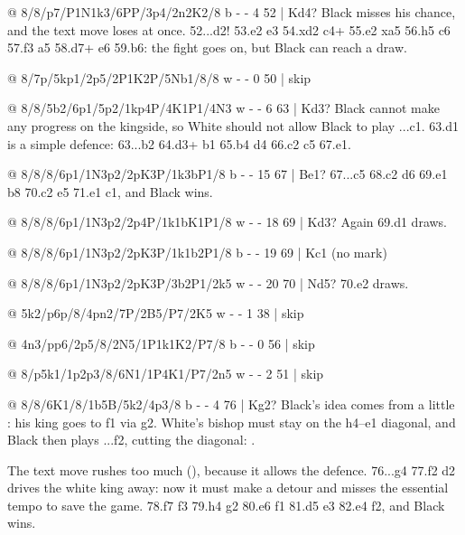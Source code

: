 @ 8/8/p7/P1N1k3/6PP/3p4/2n2K2/8 b - - 4 52 | Kd4?
Black misses his chance, and the text move loses at once. 52...d2! 53.\K e2 \N e3 54.\K xd2 \N c4+
55.\K e2 \N xa5 56.h5 \N c6 57.\K f3 a5 58.\N d7+ \K e6 59.\N b6: the fight goes on, but Black can
reach a draw.

@ 8/7p/5kp1/2p5/2P1K2P/5Nb1/8/8 w - - 0 50 | skip

@ 8/8/5b2/6p1/5p2/1kp4P/4K1P1/4N3 w - - 6 63 | Kd3?
Black cannot make any progress on the kingside, so White should not allow Black to play ...\K c1.
63.\K d1 is a simple defence: 63...\K b2 64.\N d3+ \K b1 65.\N b4 \B d4 66.\N c2 \B c5 67.\N e1.

@ 8/8/8/6p1/1N3p2/2pK3P/1k3bP1/8 b - - 15 67 | Be1?
67...\B c5 68.\N c2 \B d6 69.\N e1 \B b8 70.\N c2 \B e5 71.\N e1 \K c1, and Black wins.

@ 8/8/8/6p1/1N3p2/2p4P/1k1bK1P1/8 w - - 18 69 | Kd3?
Again 69.\K d1 draws.

@ 8/8/8/6p1/1N3p2/2pK3P/1k1b2P1/8 b - - 19 69 | Kc1 (no mark)

@ 8/8/8/6p1/1N3p2/2pK3P/3b2P1/2k5 w - - 20 70 | Nd5?
70.\K e2 draws.

@ 5k2/p6p/8/4pn2/7P/2B5/P7/2K5 w - - 1 38 | skip

@ 4n3/pp6/2p5/8/2N5/1P1k1K2/P7/8 b - - 0 56 | skip

@ 8/p5k1/1p2p3/8/6N1/1P4K1/P7/2n5 w - - 2 51 | skip

@ 8/8/6K1/8/1b5B/5k2/4p3/8 b - - 4 76 | Kg2?
Black's idea comes from a little :
his king goes to f1 via g2. White's bishop must stay on the h4--e1 diagonal, and Black then plays
...\B f2, cutting the diagonal: .

The text move rushes too much
(), because it allows the
 defence. 76...\K g4 77.\B f2 \B d2 drives the white king
away: now it must make a detour and misses the essential tempo
to save the game. 78.\K f7 \K f3 79.\B h4 \K g2 80.\K e6 \K f1 81.\K d5 \B e3 82.\K e4 \B f2, and Black wins.

